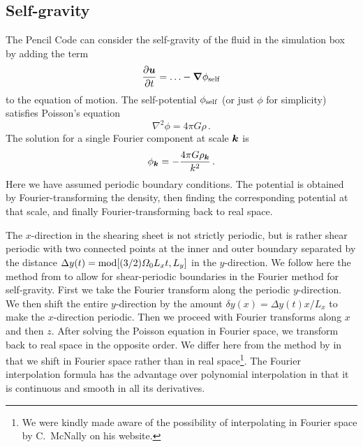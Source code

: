 \documentclass[\mydriver,12pt,twoside,notitlepage,a4paper]{article}
\renewcommand{\vec}[1]{\mbox{\boldmath{$#1$}}}
\newcommand{\vcs}[1]  {\mbox{\boldmath{$\scriptstyle{#1}$}}}
\newcommand{\nab}{\mbox{\boldmath $\nabla$} {}}
\begin{document}

\subsection{Self-gravity}

The {\sc Pencil Code} can consider the self-gravity of the fluid in the simulation
box by adding the term
\begin{equation}
  \frac{\partial \vec{u}}{\partial t}
      = \ldots - \nab \phi_{\rm self}
\end{equation}
to the equation of motion. The self-potential $\phi_{\rm self}$ (or just
$\phi$ for simplicity) satisfies Poisson's equation
\begin{equation}
  \nabla^2 \phi = 4 \pi G \rho \, .
\end{equation}
The solution for a single Fourier component at scale $\vec{k}$ is
\begin{equation}
  \phi_{\vcs{k}} = -\frac{4 \pi G \rho_{\vcs{k}}}{k^2} \, .
\end{equation}
Here we have assumed periodic boundary conditions. The potential is obtained by
Fourier-transforming the density, then finding the corresponding potential at
that scale, and finally Fourier-transforming back to real space.

The $x$-direction in the shearing sheet is not strictly periodic, but is rather
shear periodic with two connected points at the inner and outer boundary
separated by the distance $\Delta y(t)={\rm mod}[(3/2) \varOmega_0 L_x t,L_y]$
in the $y$-direction. We follow here the method from \cite{Gammie2001} to allow
for shear-periodic boundaries in the Fourier method for self-gravity. First we
take the Fourier transform along the periodic $y$-direction. We then shift
the entire $y$-direction by the amount $\delta y(x)=\Delta y(t) x/L_x$ to make
the $x$-direction periodic. Then we proceed with Fourier transforms along $x$
and then $z$. After solving the Poisson equation in Fourier space, we transform
back to real space in the opposite order. We differ here from the method by
\cite{Gammie2001} in that we shift in Fourier space rather than in real
space\footnote{We were kindly made aware of the possibility of interpolating in
Fourier space by C.\ McNally on his website.}. The Fourier interpolation formula
has the advantage over polynomial interpolation in that it is continuous and
smooth in all its derivatives.

\end{document}
